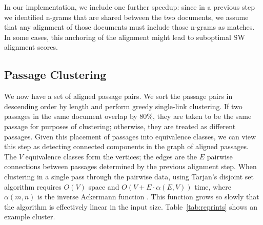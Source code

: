 \documentclass[pdftex,11pt]{article}
\newcommand{\Note}[1]{\textcolor{blue}{\small [#1]}}
\begin{document}
In our implementation, we include one further speedup: since in a
previous step we identified n-grams that are shared between the two
documents, we assume that any alignment of those documents must include
those n-grams as matches.  In some cases, this anchoring of the
alignment might lead to suboptimal SW alignment scores.

\subsection{Passage Clustering}
\label{sec:clustering}

We now have a set of aligned passage pairs.  We sort the passage pairs
in descending order by length and perform greedy single-link
clustering.  If two passages in the same document overlap by 80\%,
they are taken to be the same passage for purposes of clustering;
otherwise, they are treated as different passages.  Given this
placement of passages into equivalence classes, we can view this step
as detecting connected components in the graph of aligned passages.
The $V$ equivalence classes form the vertices; the edges are the $E$
pairwise connections between passages determined by the previous
alignment step.  When clustering in a single pass through the pairwise
data, using Tarjan's disjoint set algorithm requires $O(V)$ space and
$O(V + E \cdot \alpha(E, V))$ time, where $\alpha(m,n)$ is the inverse
Ackermann function \cite{tarjan75:_effic_good_but_not_linear}.  This
function grows so slowly that the algorithm is effectively linear in
the input size.  Table~\ref{tab:reprints} shows an example cluster.

\end{document}
